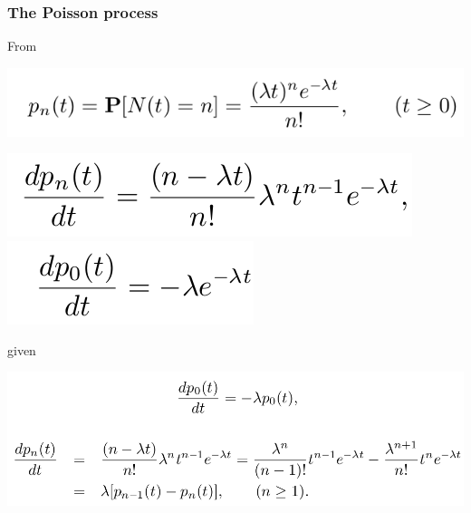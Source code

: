 \documentclass[spanish]{beamer}
\begin{document}
\begin{frame}
\frametitle{The Poisson process}
From
\begin{center}
\includegraphics[scale=0.28]{im1}
\end{center}

\begin{center}
\includegraphics[scale=0.28]{im5}
\includegraphics[scale=0.28]{im6}
\end{center}
given 
\begin{center}
\includegraphics[scale=0.32]{im11}
\end{center}

\end{frame}
\end{document}

